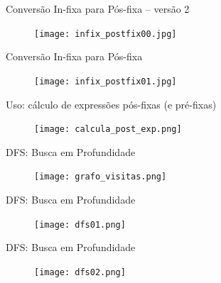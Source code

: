\begin{frame}[c]{Conversão In-fixa para Pós-fixa -- versão 2} 

		   	\begin{figure}[!htpb]
				\centering
				\texttt{[image: infix\_postfix00.jpg]}
			\end{figure} 

\end{frame}



\begin{frame}[c]{Conversão In-fixa para Pós-fixa} 

		   	\begin{figure}[!htpb]
				\centering
				\texttt{[image: infix\_postfix01.jpg]}
			\end{figure} 
\end{frame}



\begin{frame}[c]{Uso: cálculo de  expressões pós-fixas (e pré-fixas)} 

		   	\begin{figure}[!htpb]
				\centering
				\texttt{[image: calcula\_post\_exp.png]}
			\end{figure} 
\end{frame}


\begin{frame}[c]{DFS: Busca em Profundidade} 

		   	\begin{figure}[!htpb]
				\centering
				\texttt{[image: grafo\_visitas.png]}
			\end{figure} 
\end{frame}



\begin{frame}[c]{DFS: Busca em Profundidade} 

		   	\begin{figure}[!htpb]
				\centering
				\texttt{[image: dfs01.png]}
			\end{figure} 
\end{frame}



\begin{frame}[c]{DFS: Busca em Profundidade} 

		   	\begin{figure}[!htpb]
				\centering
				\texttt{[image: dfs02.png]}
			\end{figure} 
\end{frame}


